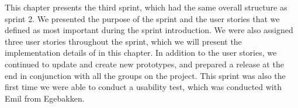 This chapter presents the third sprint, which had the same overall structure as sprint 2.
We presented the purpose of the sprint and the user stories that we defined as most important during the sprint introduction.
We were also assigned three user stories throughout the sprint, which we will present the implementation details of in this chapter.
In addition to the user stories, we continued to update and create new prototypes, and prepared a release at the end in conjunction with all the groups on the project.
This sprint was also the first time we were able to conduct a usability test, which was conducted with Emil from Egebakken.

